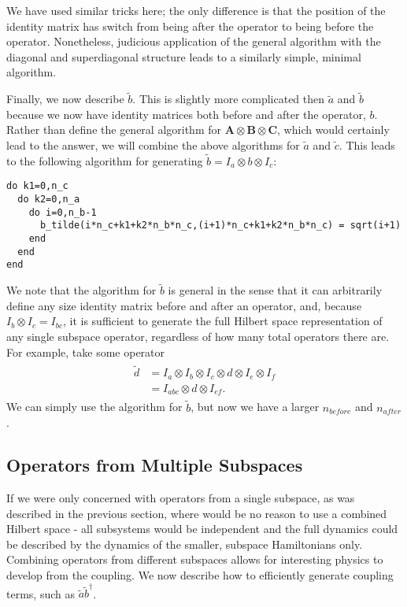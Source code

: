 \documentclass{article}
\begin{document}
We have used similar tricks here; the only difference is that the position of the identity
matrix has switch from being after the operator to being before the operator. Nonetheless,
judicious application of the general algorithm with the diagonal and superdiagonal structure
leads to a similarly simple, minimal algorithm.

Finally, we now describe $\tilde{b}$. This is slightly more complicated then
$\tilde{a}$ and $\tilde{b}$ because we now have identity matrices both before and after
the operator, $b$. Rather than define the general algorithm for
$\mathbf{A}\otimes\mathbf{B}\otimes\mathbf{C}$, which would certainly lead to the answer,
we will combine the above algorithms for $\tilde{a}$ and $\tilde{c}$.
This leads to the following algorithm for generating
$\tilde{b} = I_a \otimes b \otimes I_c$:

\begin{verbatim}
do k1=0,n_c
  do k2=0,n_a
    do i=0,n_b-1
      b_tilde(i*n_c+k1+k2*n_b*n_c,(i+1)*n_c+k1+k2*n_b*n_c) = sqrt(i+1)
    end
  end
end
\end{verbatim}

We note that the algorithm for $\tilde{b}$ is general in the sense that it can arbitrarily
define any size identity matrix before and after an operator, and, because
$I_b \otimes I_c = I_{bc}$, it is sufficient to generate the full Hilbert space representation
of any single subspace operator, regardless of how many total operators there are. For example,
take some operator 
\begin{align}
  \begin{split}
    \tilde{d} &= I_a \otimes I_b \otimes I_c \otimes d \otimes I_e \otimes I_f \\
              &= I_{abc} \otimes d \otimes I_{ef}.
  \end{split}
\end{align}
We can simply use the algorithm for $\tilde{b}$, but now we have a larger $n_{before}$ and
$n_{after}$.

\subsection{Operators from Multiple Subspaces}
If we were only concerned with operators from a single subspace, as was described in the
previous section, where would be no reason to use a combined Hilbert space - all subsystems
would be independent and the full dynamics could be described by the dynamics of the
smaller, subspace Hamiltonians only. Combining operators from different subspaces allows
for interesting physics to develop from the coupling. We now describe how to efficiently
generate coupling terms, such as $\tilde{a} \tilde{b}^\dagger$.
\end{document}
